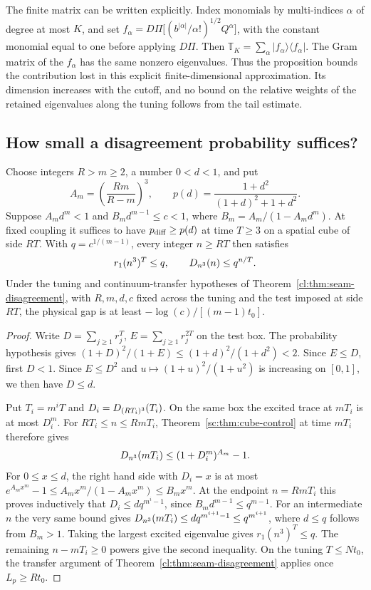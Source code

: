 The finite matrix can be written explicitly. Index monomials by
multi-indices $\alpha$ of degree at most $K$, and set
$f_\alpha=D\Pi\bigl[(b^{|\alpha|}/\alpha!)^{1/2} Q^\alpha\bigr]$,
with the constant monomial equal to one before applying $D\Pi$.
Then $\mathbb T_K=\sum_\alpha|f_\alpha\rangle\langle f_\alpha|$.
The Gram matrix of the $f_\alpha$ has the same nonzero eigenvalues.
Thus the proposition bounds the contribution lost in this explicit
finite-dimensional approximation. Its dimension increases with the
cutoff, and no bound on the relative weights of the retained eigenvalues
along the tuning follows from the tail estimate.

\subsection{How small a disagreement probability suffices?}
\begin{theorem}\label{cl:thm:seam-aspect}
Choose integers $R>m\ge2$, a number $0<d<1$, and put
\[
 A_m=\left(\frac{Rm}{R-m}\right)^3,\qquad
 p(d)=\frac{1+d^2}{(1+d)^2+1+d^2}.
\]
Suppose $A_md^m<1$ and $B_m d^{m-1}\le c<1$, where
$B_m=A_m/(1-A_md^m)$. At fixed coupling it suffices to have
$p_{\rm diff}\ge p(d)$ at time $T\ge3$ on a spatial cube of side $RT$.
With $q=c^{1/(m-1)}$, every integer $n\ge RT$ then satisfies
\[
 r_1(n^3)^T\le q,\qquad D_{n^3}(n)\le q^{n/T}.
\]
Under the tuning and continuum-transfer hypotheses of
Theorem~\ref{cl:thm:seam-disagreement}, with $R,m,d,c$ fixed across the
tuning and the test imposed at side $RT$, the physical gap is at least
$-\log(c)/[(m-1)t_0]$.
\end{theorem}
\begin{proof}
Write $D=\sum_{j\ge1}r_j^T$, $E=\sum_{j\ge1}r_j^{2T}$ on the test box.
The probability hypothesis gives
$(1+D)^2/(1+E)\le(1+d)^2/(1+d^2)<2$.
Since $E\le D$, first $D<1$. Since $E\le D^2$ and
$u\mapsto(1+u)^2/(1+u^2)$ is increasing on $[0,1]$, we then have $D\le d$.

Put $T_i=m^iT$ and $D_i=D_{(RT_i)^3}(T_i)$. On the same box the
excited trace at $mT_i$ is at most $D_i^m$. For $RT_i\le n\le RmT_i$,
Theorem~\ref{sc:thm:cube-control} at time $mT_i$ therefore gives
\[
 D_{n^3}(mT_i)\le(1+D_i^m)^{A_m}-1 .
\]
For $0\le x\le d$, the right hand side with $D_i=x$ is at most
$e^{A_mx^m}-1\le A_m x^m/(1-A_m x^m)\le B_m x^m$.
At the endpoint $n=RmT_i$ this proves inductively that
$D_i\le d q^{m^i-1}$, since $B_m d^{m-1}\le q^{m-1}$.
For an intermediate $n$ the very same bound gives
$D_{n^3}(mT_i)\le d q^{m^{i+1}-1}\le q^{m^{i+1}}$,
where $d\le q$ follows from $B_m>1$. Taking the largest excited
eigenvalue gives $r_1(n^3)^T\le q$. The remaining $n-mT_i\ge0$
powers give the second inequality. On the tuning $T\le Nt_0$, the
transfer argument of Theorem~\ref{cl:thm:seam-disagreement} applies
once $L_p\ge Rt_0$.
\end{proof}

